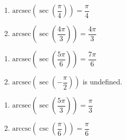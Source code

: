 \begin{multicols}{2}

\begin{enumerate}

\setcounter{enumi}{\value{HW}}

\item  $\text{arcsec}\left(\sec\left(\dfrac{\pi}{4}\right) \right) = \dfrac{\pi}{4}$ 
\item  $\text{arcsec}\left(\sec\left(\dfrac{4\pi}{3}\right) \right) = \dfrac{4\pi}{3}$

\setcounter{HW}{\value{enumi}}

\end{enumerate}

\end{multicols}

\begin{multicols}{2}

\begin{enumerate}

\setcounter{enumi}{\value{HW}}

\item  $\text{arcsec}\left(\sec\left( \dfrac{5\pi}{6} \right) \right) = \dfrac{7\pi}{6}$
\item  $\text{arcsec}\left(\sec\left(-\dfrac{\pi}{2} \right) \right)$ is undefined. 

\setcounter{HW}{\value{enumi}}

\end{enumerate}

\end{multicols}

\begin{multicols}{2}

\begin{enumerate}

\setcounter{enumi}{\value{HW}}

\item  $\text{arcsec}\left(\sec\left(\dfrac{5\pi}{3}\right) \right) = \dfrac{\pi}{3}$
\item  $\text{arccsc}\left(\csc\left(\dfrac{\pi}{6}\right) \right) = \dfrac{\pi}{6}$ 

\setcounter{HW}{\value{enumi}}

\end{enumerate}

\end{multicols}

